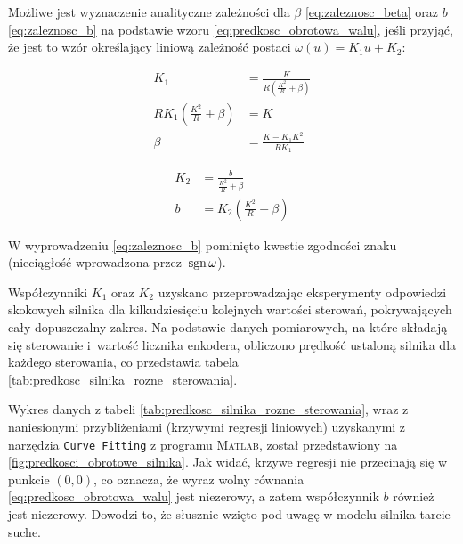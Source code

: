 Możliwe jest wyznaczenie analityczne zależności dla $\beta$ \eqref{eq:zaleznosc_beta} oraz $b$ \eqref{eq:zaleznosc_b} na podstawie wzoru \eqref{eq:predkosc_obrotowa_walu}, jeśli przyjąć, że jest to wzór określający liniową zależność postaci $\omega(u) = K_1 u + K_2$:

\begin{align}
    K_1 &= \frac{K}{R \left(\frac{K^2}{R} + \beta \right)} \nonumber \\
    R K_1 \left(\frac{K^2}{R} + \beta \right) &= K \nonumber \\
    \beta &= \frac{K - K_1 K^2}{R K_1} \label{eq:zaleznosc_beta}
\end{align}

\begin{align}
    K_2 &= \frac{b}{\frac{K^2}{R} + \beta} \nonumber \\
    b &= K_2 \left(\frac{K^2}{R} + \beta \right) \label{eq:zaleznosc_b}
\end{align}

W wyprowadzeniu \eqref{eq:zaleznosc_b} pominięto kwestie zgodności znaku (nieciągłość wprowadzona przez~$\operatorname{sgn} \omega$).

Współczynniki $K_1$ oraz $K_2$ uzyskano przeprowadzając eksperymenty odpowiedzi skokowych silnika dla kilkudziesięciu kolejnych wartości sterowań, pokrywających cały dopuszczalny zakres. Na podstawie danych pomiarowych, na które składają się sterowanie i~wartość licznika enkodera, obliczono prędkość ustaloną silnika dla każdego sterowania, co przedstawia tabela \ref{tab:predkosc_silnika_rozne_sterowania}.

Wykres danych z tabeli \ref{tab:predkosc_silnika_rozne_sterowania}, wraz z naniesionymi przybliżeniami (krzywymi regresji liniowych) uzyskanymi z narzędzia \texttt{Curve Fitting} z programu \textsc{Matlab}, został przedstawiony na \cref{fig:predkosci_obrotowe_silnika}. Jak widać, krzywe regresji nie przecinają się w punkcie $(0, 0)$, co oznacza, że wyraz wolny równania \eqref{eq:predkosc_obrotowa_walu} jest niezerowy, a zatem współczynnik $b$ również jest niezerowy. Dowodzi to, że słusznie wzięto pod uwagę w modelu silnika tarcie suche.


